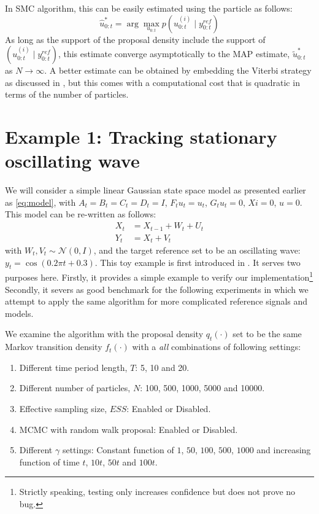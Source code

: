 In SMC algorithm, this can be easily estimated using the particle as follows:
\begin{equation}
\hat{u}^*_{0:t} = \arg\max_{u_{0:t}} p(u^{(i)}_{0:t} \mid y^{ref}_{0:t})
\end{equation}
As long as the support of the proposal density include the support of $(u^{(i)}_{0:t} \mid y^{ref}_{0:t})$, this estimate converge asymptotically to the MAP estimate, $\tilde{u}^*_{0:t}$ as $N \to \infty$. A better estimate can be obtained by embedding the Viterbi strategy as discussed in \cite{SG01}, but this comes with a computational cost that is quadratic in terms of the number of particles.

\section{Example 1: Tracking stationary oscillating wave}
\label{sec:exp1}
We will consider a simple linear Gaussian state space model as presented earlier as \eqref{eq:model}, with $A_t=B_t=C_t=D_t=I$, $F_t{u_t}=u_t$, $G_t{u_t}=0$, $Xi = 0$, $u=0$. This model can be re-written as follows:
\begin{align}
  X_t &= X_{t-1} + W_t + U_t \nonumber \\
  Y_t &= X_t + V_t
\label{eq:refnmodel}
\end{align}
with $W_t, V_t \sim \mathcal{N}(0,I)$, and the target reference set to be an oscillating wave: $y_t = \cos(0.2 \pi t + 0.3)$. This toy example is first introduced in \cite{NK11}. It serves two purposes here. Firstly, it provides a simple example to verify our implementation\footnote{Strictly speaking, testing only increases confidence but  does not prove no bug.} Secondly, it severs as good benchmark for the following experiments in which we attempt to apply the same algorithm for more complicated reference signals and models.

We examine the algorithm with the proposal density $q_t(\cdot)$ set to be the same Markov transition density $f_t(\cdot)$ with a \emph{all} combinations of following settings:
\begin{enumerate}
\item Different time period length, $T$: 5, 10 and 20.
\item Different number of particles, $N$: 100, 500, 1000, 5000 and 10000.
\item Effective sampling size, $ESS$: Enabled or Disabled.
\item MCMC with random walk proposal: Enabled or Disabled.
\item Different $\gamma$ settings: Constant function of $1$, $50$, $100$, $500$, $1000$ and increasing function of time $t$,  $10t$, $50t$ and $100t$. 
\end{enumerate}

